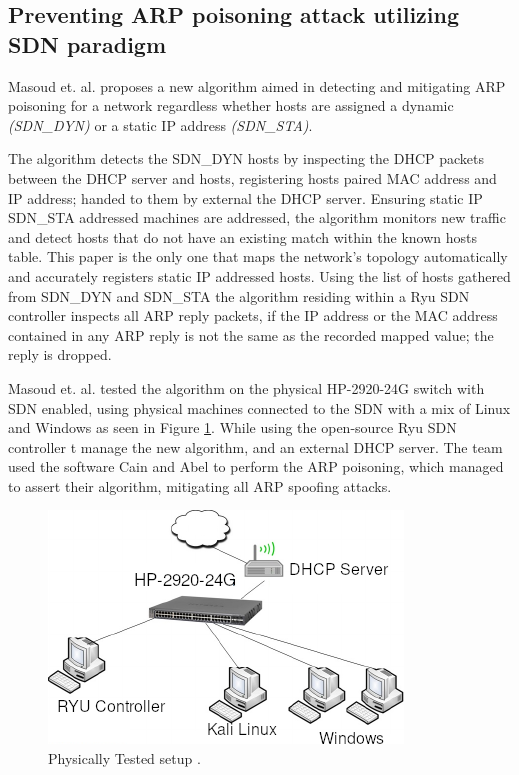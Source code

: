 \documentclass[12pt, oneside]{book}
\begin{document}



\subsection{Preventing ARP poisoning attack utilizing SDN paradigm}
\label{subsec:preventARPLIT}
Masoud et. al. proposes a new algorithm aimed in detecting and mitigating ARP poisoning for a network regardless whether hosts are 
assigned a dynamic \emph{(SDN\_DYN)} or a static IP address \emph{(SDN\_STA)}\cite{masoud2015preventing}.

The algorithm detects the SDN\_DYN hosts by inspecting the DHCP packets between the DHCP server and hosts, registering hosts paired
MAC address and IP address; handed to them by external the DHCP server.
Ensuring static IP SDN\_STA addressed machines are addressed, the algorithm monitors new traffic and detect hosts that 
do not have an existing match within the known hosts table. This paper is the only one that maps the network's topology
automatically and accurately registers static IP addressed hosts.
Using the list of hosts gathered from SDN\_DYN and SDN\_STA the algorithm residing within a Ryu SDN controller inspects
all ARP reply packets, if the IP address or the MAC address contained in any ARP reply is not the same as the recorded mapped value; 
the reply is dropped.


Masoud et. al. tested the algorithm on the physical HP-2920-24G switch with SDN enabled, using physical machines connected to 
the SDN with a mix of Linux and Windows as seen in Figure \ref{fig:Fuck}. While using the open-source Ryu SDN controller t
manage the new algorithm, and an external DHCP server.
The team used the software Cain and Abel \cite{cainandabel} to perform the ARP 
poisoning, which managed to assert their algorithm, mitigating all ARP spoofing attacks\cite{masoud2015preventing}.

\begin{figure}[H]
  \centering
  \includegraphics[scale=0.6]{images/hp_layout.png}
  \caption{Physically Tested setup \cite{masoud2015preventing}.}
  \label{fig:Fuck}
\end{figure}
\end{document}
